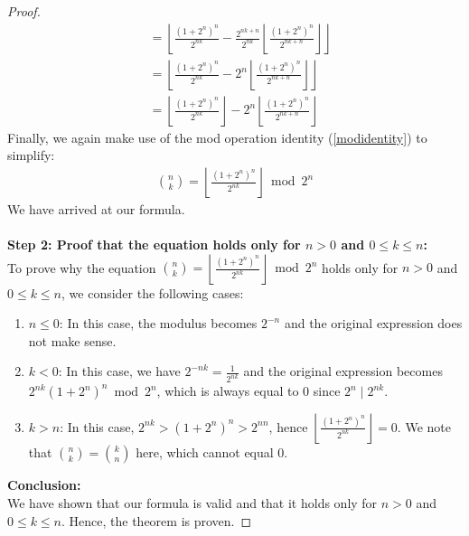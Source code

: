 \documentclass{article}
\theoremstyle{plain}
\begin{document}
\begin{proof}
\begin{align}
&= \left\lfloor\frac{(1 + 2^{n})^{n}}{2^{n k}} - \frac{2^{n k + n}}{2^{n k}} \left\lfloor \frac{(1 + 2^{n})^{n}}{2^{n k + n}} \right\rfloor\right\rfloor \\
&= \left\lfloor\frac{(1 + 2^{n})^{n}}{2^{n k}} - 2^{n} \left\lfloor \frac{(1 + 2^{n})^{n}}{2^{n k + n}} \right\rfloor\right\rfloor \\
&= \left\lfloor\frac{(1 + 2^{n})^{n}}{2^{n k}}\right\rfloor - 2^{n} \left\lfloor \frac{(1 + 2^{n})^{n}}{2^{n k + n}} \right\rfloor
\end{align}
Finally, we again make use of the mod operation identity (\ref{modidentity}) to simplify:
\begin{align}
\binom{n}{k} = \left\lfloor\frac{(1 + 2^{n})^{n}}{2^{n k}}\right\rfloor \bmod{2^{n}}
\end{align}
We have arrived at our formula.
\\
\\
\textbf{Step 2: Proof that the equation holds only for $n > 0$ and $0 \leq k \leq n$:}
\\
To prove why the equation $\binom{n}{k} = \left\lfloor\frac{(1 + 2^n)^n}{2^{nk}}\right\rfloor \bmod{2^n}$ holds only for $n > 0$ and $0 \leq k \leq n$, we consider the following cases:

\begin{enumerate}
\item $n \leq 0$: In this case, the modulus becomes $2^{-n}$ and the original expression does not make sense.

\item $k < 0$: In this case, we have $2^{-nk} = \frac{1}{2^{nk}}$ and the original expression becomes $2^{nk} (1 + 2^n)^n \bmod{2^n}$, which is always equal to $0$ since $2^{n} \mid 2^{nk}$.

\item $k > n$: In this case, $2^{nk} > (1 + 2^n)^n > 2^{nn}$, hence $\left\lfloor\frac{(1 + 2^n)^n}{2^{nk}}\right\rfloor = 0$. We note that $\binom{n}{k} = \binom{k}{n}$ here, which cannot equal $0$.
\end{enumerate}
\noindent
\textbf{Conclusion:}
\\
We have shown that our formula is valid and that it holds only for $n > 0$ and $0 \leq k \leq n$. Hence, the theorem is proven.
\end{proof}
\end{document}
